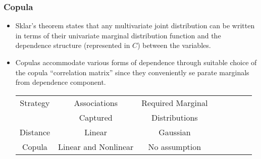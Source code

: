 \documentclass[pdf,9pt,xcolor=dvipsnames,hide notes]{beamer}
\begin{document}
\begin{frame}[label=frame4b]
	\frametitle{Copula}
	
	\begin{itemize}
	\justifying
		
		\item Sklar's theorem states that any multivariate joint distribution can be written in terms of their univariate marginal distribution function and the dependence structure (represented in $C$) between the variables.
		
		\vspace{0.3cm}
		
		
		\item Copulas accommodate various forms of dependence through suitable choice of the copula ``correlation matrix'' since they conveniently se \linebreak parate marginals from dependence component.
		
		\vspace{0.3cm}
		
		
		\begin{table}[ht]
			\centering
			\begin{tabular}{c|ccccccc}
				\hline
				\rowcolor{corn}
				Strategy & Associations & Required Marginal \\
				\rowcolor{corn}
				& Captured & Distributions \\
				\hline
				Distance& Linear & Gaussian \\
				Copula& Linear and Nonlinear & No assumption \\
				\hline
			\end{tabular}
		\end{table}
		


\end{itemize}
\end{frame}
\end{document}
